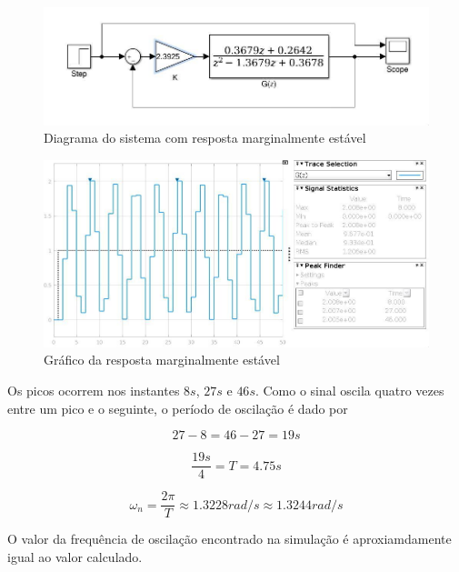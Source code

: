 \documentclass{article}
\begin{document}
\begin{figure}[H]
    \centering
        \includegraphics[width=.8\linewidth]{images/Simulink_diagram_marginally_stable.jpg}
        \caption{Diagrama do sistema com resposta marginalmente estável}\label{fig:diagram_marginally_stable}
\end{figure}

\begin{figure}[H]
    \centering
        \includegraphics[width=.8\linewidth]{images/simulink_scope_marginally_stable.jpg}
        \caption{Gráfico da resposta marginalmente estável}\label{fig:scope_marginally_stable}
\end{figure}

    {Os picos ocorrem nos instantes $8s$, $27s$ e $46s$. Como o sinal oscila
    quatro vezes entre um pico e o seguinte, o período de oscilação é dado por}

    \[ 27 - 8 = 46 - 27 = 19s \]

    \[ \frac{19s}{4} = T = 4.75s \]

    \[ \omega_n = \frac{2 \pi}{T} \approx 1.3228 rad/s \approx 1.3244 rad/s \]

    {O valor da frequência de oscilação encontrado na simulação é aproxiamdamente
    igual ao valor calculado.}
\end{document}
